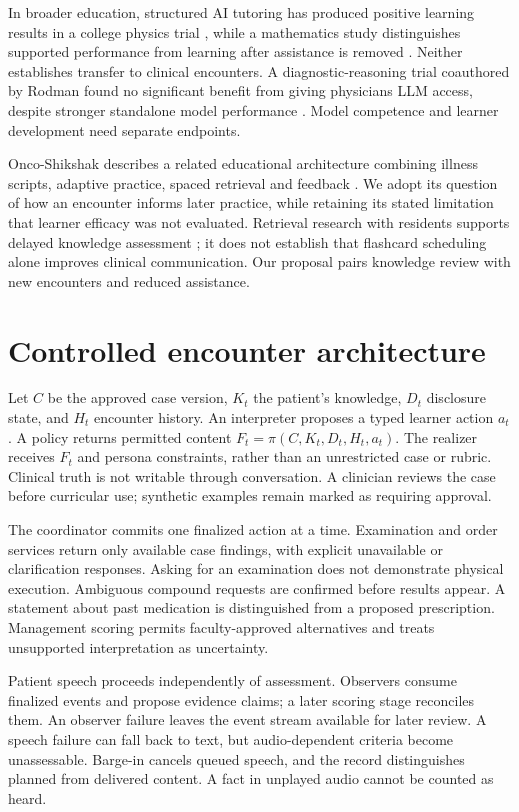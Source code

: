 \documentclass[pmlr,twocolumn,10pt]{jmlr}
\begin{document}
In broader education, structured AI tutoring has produced positive learning results in a college physics trial \citep{kestin2025}, while a mathematics study distinguishes supported performance from learning after assistance is removed \citep{bastani2025}. Neither establishes transfer to clinical encounters. A diagnostic-reasoning trial coauthored by Rodman found no significant benefit from giving physicians LLM access, despite stronger standalone model performance \citep{goh2024}. Model competence and learner development need separate endpoints.

Onco-Shikshak describes a related educational architecture combining illness scripts, adaptive practice, spaced retrieval and feedback \citep{makani2026}. We adopt its question of how an encounter informs later practice, while retaining its stated limitation that learner efficacy was not evaluated. Retrieval research with residents supports delayed knowledge assessment \citep{larsen2009}; it does not establish that flashcard scheduling alone improves clinical communication. Our proposal pairs knowledge review with new encounters and reduced assistance.

\section{Controlled encounter architecture}
Let $C$ be the approved case version, $K_t$ the patient's knowledge, $D_t$ disclosure state, and $H_t$ encounter history. An interpreter proposes a typed learner action $a_t$. A policy returns permitted content $F_t=\pi(C,K_t,D_t,H_t,a_t)$. The realizer receives $F_t$ and persona constraints, rather than an unrestricted case or rubric. Clinical truth is not writable through conversation. A clinician reviews the case before curricular use; synthetic examples remain marked as requiring approval.

The coordinator commits one finalized action at a time. Examination and order services return only available case findings, with explicit unavailable or clarification responses. Asking for an examination does not demonstrate physical execution. Ambiguous compound requests are confirmed before results appear. A statement about past medication is distinguished from a proposed prescription. Management scoring permits faculty-approved alternatives and treats unsupported interpretation as uncertainty.

Patient speech proceeds independently of assessment. Observers consume finalized events and propose evidence claims; a later scoring stage reconciles them. An observer failure leaves the event stream available for later review. A speech failure can fall back to text, but audio-dependent criteria become unassessable. Barge-in cancels queued speech, and the record distinguishes planned from delivered content. A fact in unplayed audio cannot be counted as heard.
\end{document}
